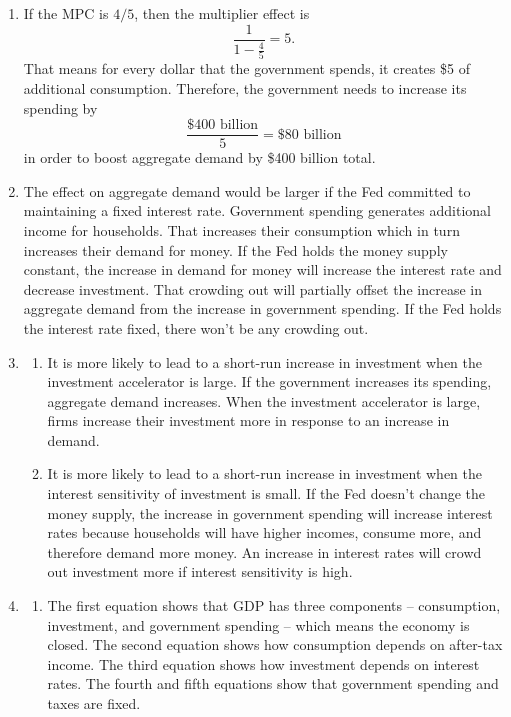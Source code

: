 \documentclass{article}
\begin{document}
\begin{enumerate}
\item If the MPC is $4/5$, then the multiplier effect is
	\[ \frac{1}{1 - \frac{4}{5}} = 5. \]
	That means for every dollar that the government spends, it creates \$5 of additional consumption. Therefore, the government needs to increase its spending by \[\frac{\$400 \text{ billion}}{5} = \$80 \text{ billion}\] in order to boost aggregate demand by \$400 billion total.

\item The effect on aggregate demand would be larger if the Fed committed to maintaining a fixed interest rate. Government spending generates additional income for households. That increases their consumption which in turn increases their demand for money. If the Fed holds the money supply constant, the increase in demand for money will increase the interest rate and decrease investment. That crowding out will partially offset the increase in aggregate demand from the increase in government spending. If the Fed holds the interest rate fixed, there won't be any crowding out.

\item 

	\begin{enumerate}
	
	\item It is more likely to lead to a short-run increase in investment when the investment accelerator is large. If the government increases its spending, aggregate demand increases. When the investment accelerator is large, firms increase their investment more in response to an increase in demand.
	
	\item It is more likely to lead to a short-run increase in investment when the interest sensitivity of investment is small. If the Fed doesn't change the money supply, the increase in government spending will increase interest rates because households will have higher incomes, consume more, and therefore demand more money. An increase in interest rates will crowd out investment more if interest sensitivity is high.
	
	\end{enumerate}

\item

	\begin{enumerate}
	
	\item The first equation shows that GDP has three components -- consumption, investment, and government spending -- which means the economy is closed. The second equation shows how consumption depends on after-tax income. The third equation shows how investment depends on interest rates. The fourth and fifth equations show that government spending and taxes are fixed.
	

\end{enumerate}
\end{enumerate}
\end{document}
